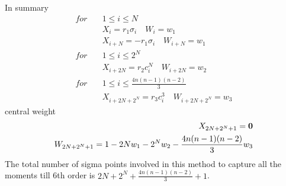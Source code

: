 \documentclass[letterpaper, 10 pt, conference]{ieeeconf}  %
\begin{document}
In summary
\setlength{\arraycolsep}{0.0em}
\begin{eqnarray}
for\quad &1\le i\le N\\
&X_i=r_1\sigma_i \quad W_i=w_1\\
&X_{i+N}=-r_1\sigma_i \quad W_{i+N}=w_1\\
for \quad &1 \le i \le 2^N\\
&X_{i+2N}=r_2c^N_i \quad W_{i+2N}=w_2\\
for \quad &1 \le i \le \frac{4n(n-1)(n-2)}{3}\\
&X_{i+2N+2^N}=r_3c^3_i \quad W_{i+2N+2^N}=w_3
\end{eqnarray}
\setlength{\arraycolsep}{5pt}
central weight
\setlength{\arraycolsep}{0.0em}
\begin{eqnarray}
X_{2N+2^N+1}={\bf 0} \\
W_{2N+2^N+1}=1-2Nw_1-2^Nw_2-\frac{4n(n-1)(n-2)}{3}w_3
\end{eqnarray}
\setlength{\arraycolsep}{5pt}
The total number of sigma points involved in this method to capture all the moments till 6th order is $2N+2^N+\frac{4n(n-1)(n-2)}{3}+1$. 

 
\end{document}
